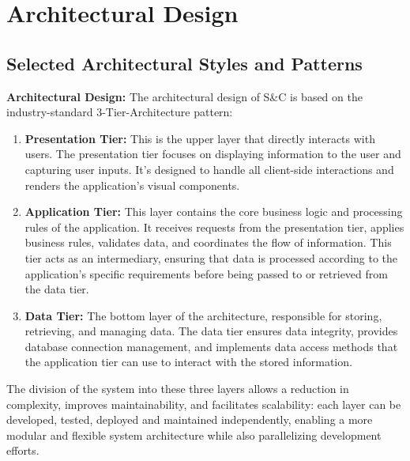 \chapter{Architectural Design}
\label{ch:architectural-design}%


\section{Selected Architectural Styles and Patterns}
\label{sec:selected-architectural-styles-patterns}%

\par{\textbf{Architectural Design:}} The architectural design of S\&C is based on the industry-standard 3-Tier-Architecture pattern:

\begin{enumerate}
      \item \textbf{Presentation Tier:} This is the upper layer that directly interacts with users. The presentation tier
            focuses on displaying information to the user and capturing user inputs. It's designed to handle all client-side
            interactions and renders the application's visual components.
      \item \textbf{Application Tier:} This layer contains the core business logic and processing rules of the
            application. It receives requests from the presentation tier, applies business rules, validates data, and
            coordinates the flow of information. This tier acts as an intermediary, ensuring that data is processed
            according to the application's specific requirements before being passed to or retrieved from the data tier.
      \item \textbf{Data Tier:} The bottom layer of the architecture, responsible for storing, retrieving, and managing
            data. The data tier ensures data integrity, provides database connection management, and implements data
            access methods that the application tier can use to interact with the stored information.
\end{enumerate}

The division of the system into these three layers allows a reduction in complexity, improves maintainability, and
facilitates scalability: each layer can be developed, tested, deployed and maintained independently, enabling a more
modular and flexible system architecture while also parallelizing development efforts.

